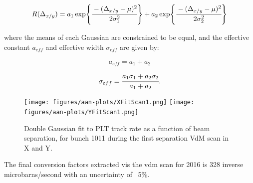 
$$
R(\Delta_{x/y}) = a_{1}\exp{\cfrac{-(\Delta_{x/y} - \mu)^{2}}{2\sigma^{2}_{1}}} + a_{2}\exp{\cfrac{-(\Delta_{x/y} - \mu)^{2}}{2\sigma^{2}_{2}}}
 $$

where the means of each Gaussian are constrained to be equal, and the effective constant $a_{eff}$ and effective width $\sigma_{eff}$ are given by:

$$a_{eff} = a_{1} + a_{2}$$

$$\sigma_{eff} = \cfrac{a_{1}\sigma_{1} + a_{2}\sigma_{2}}{a_{1} + a_{2}}.$$


\begin{figure}[htp]
\begin{center}
\texttt{[image: figures/aan-plots/XFitScan1.png]}
\texttt{[image: figures/aan-plots/YFitScan1.png]}
        \captionsetup{format=hang}
\caption{Double Gaussian fit to PLT track rate as a function of beam separation, for bunch 1011 during the first separation VdM scan in X and Y.}
\label{fig:Scan1Fits}
\end{center}
\end{figure}

The final conversion factors extracted vis the vdm scan for 2016 is 328 inverse microbarns/second with an uncertainty of ~5\%. %

